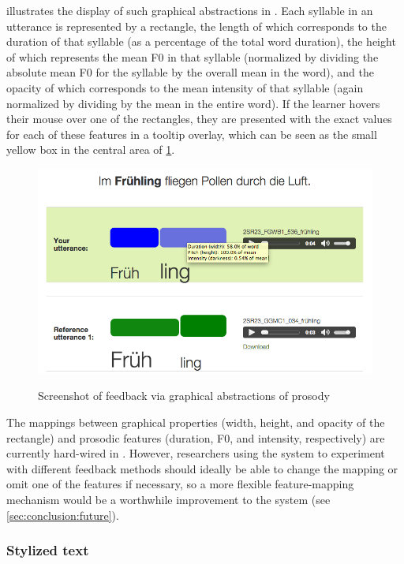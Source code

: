 			 illustrates the display of such graphical abstractions in . Each syllable in an utterance is represented by a rectangle, the length of which corresponds to the duration of that syllable (as a percentage of the total word duration), the height of which represents the mean F0 in that syllable (normalized by dividing the absolute mean F0 for the syllable by the overall mean in the word), and the opacity of which corresponds to the mean intensity of that syllable (again normalized by dividing by the mean in the entire word). If the learner hovers their mouse over one of the rectangles, they are presented with the exact values for each of these features in a tooltip overlay, which can be seen as the small yellow box in the central area of \cref{fig:rectangles}.
			
				\begin{figure}
					\centering
					\caption[Feedback via graphical abstractions of prosody]{Screenshot of feedback via graphical abstractions of prosody}
					\includegraphics[width=\textwidth]{img/screenshots/rectanglesWithOpacity}
					\label{fig:rectangles}
				\end{figure}			
			
			The mappings between graphical properties (width, height, and opacity of the rectangle) and prosodic features (duration, F0, and intensity, respectively) are currently hard-wired in . However, researchers using the system to experiment with different feedback methods should ideally be able to change the mapping or omit one of the features if necessary, so a more flexible feature-mapping mechanism would be a worthwhile improvement to the system (see \cref{sec:conclusion:future}).
			
			
			\subsubsection{Stylized text}
			\label{sec:implicit:visual:text}
			
